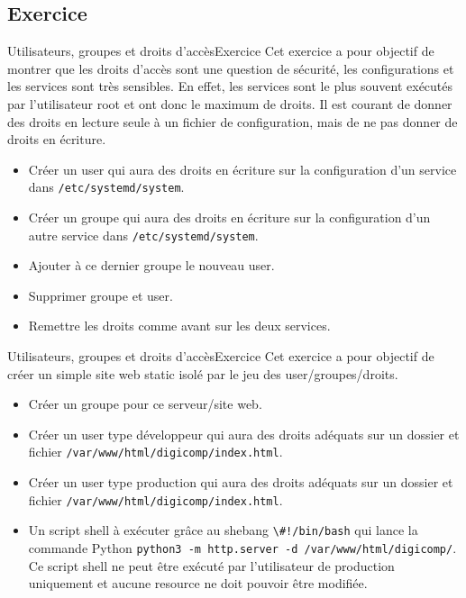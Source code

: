 \documentclass{beamer}
\begin{document}
    \subsection{Exercice}\label{subsec:user-group-rights-exercice}
    \begin{frame}{Utilisateurs, groupes et droits d'accès}{Exercice \execcounterdispinc}
        Cet exercice a pour objectif de montrer que les droits d'accès sont une question de sécurité, les configurations et les services sont très sensibles.
        En effet, les services sont le plus souvent exécutés par l'utilisateur root et ont donc le maximum de droits.
        \bigbreak
        Il est courant de donner des droits en lecture seule à un fichier de configuration, mais de ne pas donner de droits en écriture.
        \begin{itemize}
            \item Créer un user qui aura des droits en écriture sur la configuration d'un service dans \lstinline{/etc/systemd/system}.
            \item Créer un groupe qui aura des droits en écriture sur la configuration d'un autre service dans \lstinline{/etc/systemd/system}.
            \item Ajouter à ce dernier groupe le nouveau user.
            \item Supprimer groupe et user.
            \item Remettre les droits comme avant sur les deux services.
        \end{itemize}
    \end{frame}

    \begin{frame}{Utilisateurs, groupes et droits d'accès}{Exercice \execcounterdispinc}
        Cet exercice a pour objectif de créer un simple site web static isolé par le jeu des user/groupes/droits.
        \begin{itemize}
            \item Créer un groupe pour ce serveur/site web.
            \item Créer un user type développeur qui aura des droits adéquats sur un dossier et fichier \lstinline{/var/www/html/digicomp/index.html}.
            \item Créer un user type production qui aura des droits adéquats sur un dossier et fichier \lstinline{/var/www/html/digicomp/index.html}.
            \item Un script shell à exécuter grâce au shebang \lstinline{\#!/bin/bash} qui lance la commande Python \lstinline{python3 -m http.server -d /var/www/html/digicomp/}.
            Ce script shell ne peut être exécuté par l'utilisateur de production uniquement et aucune resource ne doit pouvoir être modifiée.
        \end{itemize}
    \end{frame}
\end{document}
